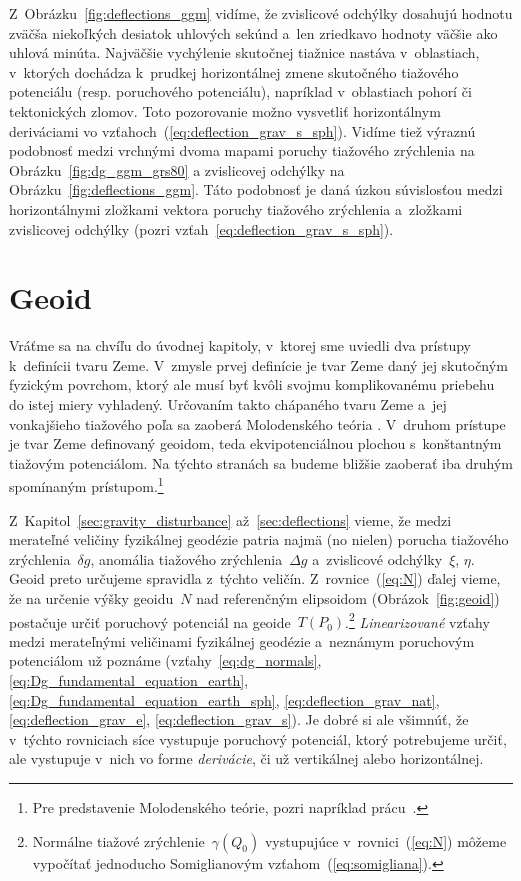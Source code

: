 \documentclass[a4paper,12pt]{book}
\begin{document}
Z~Obrázku~\ref{fig:deflections_ggm} vidíme, že zvislicové odchýlky dosahujú 
hodnotu zväčša niekoľkých desiatok uhlových sekúnd a~len zriedkavo hodnoty 
väčšie ako uhlová minúta.  Najväčšie vychýlenie skutočnej tiažnice nastáva 
v~oblastiach, v~ktorých dochádza k~prudkej horizontálnej zmene skutočného 
tiažového potenciálu (resp. poruchového potenciálu), napríklad v~oblastiach 
pohorí či tektonických zlomov.  Toto pozorovanie možno vysvetliť horizontálnym 
deriváciami vo vzťahoch~(\ref{eq:deflection_grav_s_sph}).  Vidíme tiež výraznú 
podobnosť medzi vrchnými dvoma mapami poruchy tiažového zrýchlenia na 
Obrázku~\ref{fig:dg_ggm_grs80} a zvislicovej odchýlky na 
Obrázku~\ref{fig:deflections_ggm}.  Táto podobnosť je daná úzkou súvislosťou 
medzi horizontálnymi zložkami vektora poruchy tiažového zrýchlenia a~zložkami 
zvislicovej odchýlky (pozri vzťah~\ref{eq:deflection_grav_s_sph}).







\chapter{Geoid}
\label{sec:geoid}

Vráťme sa na chvíľu do úvodnej kapitoly, v~ktorej sme uviedli dva prístupy 
k~definícii tvaru Zeme.  V~zmysle prvej definície je tvar Zeme daný jej 
skutočným fyzickým povrchom, ktorý ale musí byť kvôli svojmu komplikovanému 
priebehu do istej miery vyhladený.  Určovaním takto chápaného tvaru Zeme a~jej 
vonkajšieho tiažového poľa sa zaoberá Molodenského teória 
\parencite{Molodensky1962,Borre2006,MoritzAdvancedGeodesy,MoritzPhysicalGeodesy}.  
V~druhom prístupe je tvar Zeme definovaný geoidom, teda ekvipotenciálnou 
plochou s~konštantným tiažovým potenciálom.  Na týchto stranách sa budeme 
bližšie zaoberať iba druhým spomínaným prístupom.\footnote{Pre predstavenie 
Molodenského teórie, pozri napríklad prácu~\textcite{Janak2006}.}

Z~Kapitol~\ref{sec:gravity_disturbance} až~\ref{sec:deflections} vieme, že 
medzi merateľné veličiny fyzikálnej geodézie patria najmä (no nielen) porucha 
tiažového zrýchlenia~$\delta g$, anomália tiažového zrýchlenia~$\Delta g$ 
a~zvislicové odchýlky~$\xi$, $\eta$.  Geoid preto určujeme spravidla z~týchto 
veličín.  Z~rovnice~(\ref{eq:N}) ďalej vieme, že na určenie výšky geoidu~$N$ 
nad referenčným elipsoidom (Obrázok~\ref{fig:geoid}) postačuje určiť poruchový 
potenciál na geoide~$T(P_0)$.\footnote{Normálne tiažové 
zrýchlenie~$\gamma(Q_0)$ vystupujúce v~rovnici~(\ref{eq:N}) môžeme vypočítať 
jednoducho Somiglianovým vzťahom~(\ref{eq:somigliana}).}  \emph{Linearizované} 
vzťahy medzi merateľnými veličinami fyzikálnej geodézie a~neznámym poruchovým 
potenciálom už poznáme (vzťahy~\ref{eq:dg_normals}, 
\ref{eq:Dg_fundamental_equation_earth}, 
\ref{eq:Dg_fundamental_equation_earth_sph}, \ref{eq:deflection_grav_nat}, 
\ref{eq:deflection_grav_e}, \ref{eq:deflection_grav_s}).  Je dobré si ale 
všimnúť, že v~týchto rovniciach síce vystupuje poruchový potenciál, ktorý 
potrebujeme určiť, ale vystupuje v~nich vo forme \emph{derivácie}, či už 
vertikálnej alebo horizontálnej.
\end{document}
